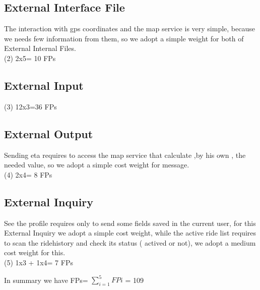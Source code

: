   \subsection{External Interface File}
  The interaction with gps coordinates and the map service is very simple, 
  because we needs few information from them, so we adopt a simple weight for
  both of External Internal Files.\\
(2) 2x5= 10 FPs
  \subsection{External Input}
 (3) 12x3=36 FPs
  \subsection{External Output}
  Sending eta requires to access the map service that calculate ,by his own ,
  the needed value, so we adopt a simple cost weight for message.\\
(4) 2x4= 8 FPs
  \subsection{External Inquiry}
  See the profile requires only to send some fields saved in the current user,
  for this External Inquiry we adopt a simple cost weight, while the active
  ride list requires to scan the ridehistory and check its status ( actived or
  not), we adopt a medium cost weight for this.\\
(5) 1x3 + 1x4= 7 FPs

In summary we have FPs= $\displaystyle\sum_{i=1}^{5} FPi$ = 109